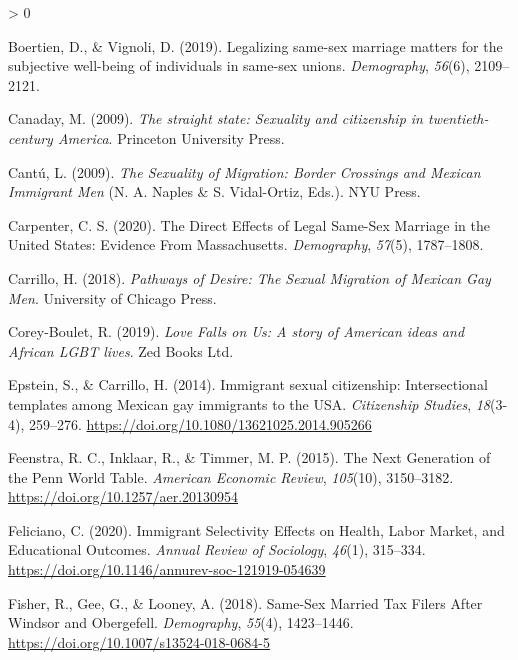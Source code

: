 \documentclass[
  11pt,
]{article}
\newlength{\cslhangindent}
\newenvironment{CSLReferences}[2] %
 {%
  \setlength{\parindent}{0pt}
  \ifodd #1 \everypar{\setlength{\hangindent}{\cslhangindent}}\ignorespaces\fi
  \ifnum #2 > 0
  \setlength{\parskip}{#2\baselineskip}
  \fi
 }%
 {}
\begin{document}
\begin{CSLReferences}{1}{0}
\leavevmode\hypertarget{ref-boertien_2019}{}%
Boertien, D., \& Vignoli, D. (2019). Legalizing same-sex marriage matters for the subjective well-being of individuals in same-sex unions. \emph{Demography}, \emph{56}(6), 2109--2121.

\leavevmode\hypertarget{ref-canaday_2009}{}%
Canaday, M. (2009). \emph{The straight state: Sexuality and citizenship in twentieth-century {America}}. Princeton University Press.

\leavevmode\hypertarget{ref-cantu_2009}{}%
Cantú, L. (2009). \emph{The {Sexuality} of {Migration}: {Border} {Crossings} and {Mexican} {Immigrant} {Men}} (N. A. Naples \& S. Vidal-Ortiz, Eds.). NYU Press.

\leavevmode\hypertarget{ref-carpenter_2020}{}%
Carpenter, C. S. (2020). The {Direct} {Effects} of {Legal} {Same}-{Sex} {Marriage} in the {United} {States}: {Evidence} {From} {Massachusetts}. \emph{Demography}, \emph{57}(5), 1787--1808.

\leavevmode\hypertarget{ref-carrillo_2018}{}%
Carrillo, H. (2018). \emph{Pathways of {Desire}: {The} {Sexual} {Migration} of {Mexican} {Gay} {Men}}. University of Chicago Press.

\leavevmode\hypertarget{ref-corey-boulet_2019}{}%
Corey-Boulet, R. (2019). \emph{Love {Falls} on {Us}: A story of {American} ideas and {African} {LGBT} lives}. Zed Books Ltd.

\leavevmode\hypertarget{ref-epstein_2014}{}%
Epstein, S., \& Carrillo, H. (2014). Immigrant sexual citizenship: Intersectional templates among {Mexican} gay immigrants to the {USA}. \emph{Citizenship Studies}, \emph{18}(3-4), 259--276. \url{https://doi.org/10.1080/13621025.2014.905266}

\leavevmode\hypertarget{ref-feenstra_2015}{}%
Feenstra, R. C., Inklaar, R., \& Timmer, M. P. (2015). The {Next} {Generation} of the {Penn} {World} {Table}. \emph{American Economic Review}, \emph{105}(10), 3150--3182. \url{https://doi.org/10.1257/aer.20130954}

\leavevmode\hypertarget{ref-feliciano_2020}{}%
Feliciano, C. (2020). Immigrant {Selectivity} {Effects} on {Health}, {Labor} {Market}, and {Educational} {Outcomes}. \emph{Annual Review of Sociology}, \emph{46}(1), 315--334. \url{https://doi.org/10.1146/annurev-soc-121919-054639}

\leavevmode\hypertarget{ref-fisher_2018}{}%
Fisher, R., Gee, G., \& Looney, A. (2018). Same-{Sex} {Married} {Tax} {Filers} {After} {Windsor} and {Obergefell}. \emph{Demography}, \emph{55}(4), 1423--1446. \url{https://doi.org/10.1007/s13524-018-0684-5}


\end{CSLReferences}
\end{document}
